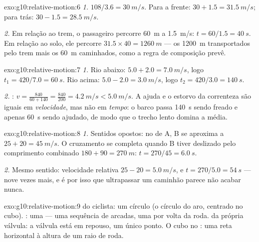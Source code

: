 \begin{solution}{exo:g10:relative-motion:6}
\emph{1.} $108/3.6 = \qty{30}{m/s}$. Para a frente:
$30 + 1.5 = \qty{31.5}{m/s}$; para trás:
$30 - 1.5 = \qty{28.5}{m/s}$.

\emph{2.} Em relação ao trem, o passageiro percorre \qty{60}{m} a
\qty{1.5}{m/s}: $t = 60/1.5 = \qty{40}{s}$. Em relação ao solo, ele
percorre $31.5 \times 40 = \qty{1260}{m}$ --- os \qty{1200}{m}
transportados pelo trem mais os \qty{60}{m} caminhados, como a regra de
composição prevê.
\end{solution}

\begin{solution}{exo:g10:relative-motion:7}
\emph{1.} Rio abaixo: $5.0 + 2.0 = \qty{7.0}{m/s}$, logo
$t_1 = 420/7.0 = \qty{60}{s}$. Rio acima: $5.0 - 2.0 = \qty{3.0}{m/s}$,
logo $t_2 = 420/3.0 = \qty{140}{s}$.

\emph{2.} : $v = \frac{840}{60 + 140}
= \frac{840}{200} = \qty{4.2}{m/s} < \qty{5.0}{m/s}$. A ajuda e o
estorvo da correnteza são iguais em \emph{velocidade}, mas não em
\emph{tempo}: o barco passa \qty{140}{s} sendo freado e apenas
\qty{60}{s} sendo ajudado, de modo que o trecho lento domina a média.
\end{solution}

\begin{solution}{exo:g10:relative-motion:8}
\emph{1.} Sentidos opostos: no  de A, B se aproxima a
$25 + 20 = \qty{45}{m/s}$. O cruzamento se completa quando B tiver
deslizado pelo comprimento combinado $180 + 90 = \qty{270}{m}$:
$t = 270/45 = \qty{6.0}{s}$.

\emph{2.} Mesmo sentido: velocidade relativa $25 - 20 = \qty{5.0}{m/s}$,
e $t = 270/5.0 = \qty{54}{s}$ --- nove vezes mais, e é por isso que
ultrapassar um caminhão parece não acabar nunca.
\end{solution}

\begin{solution}{exo:g10:relative-motion:9}
 do ciclista: um círculo (o círculo do aro, centrado no cubo).
: uma  --- uma sequência de arcadas, uma por
volta da roda.  da própria válvula: a válvula está em repouso,
um único ponto. O cubo no : uma reta horizontal à
altura de um raio de roda.
\end{solution}


